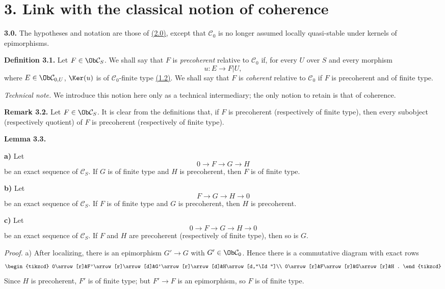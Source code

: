 \section*{3. Link with the classical notion of coherence}

\textbf{3.0.} The hypotheses and notation are those of \hyperlink{sga6.e01.para.2-0}{(2.0)}, except that \(\mathcal C_0\) is no longer assumed locally quasi-stable under kernels of epimorphisms.

\textbf{Definition 3.1.} Let \(F\in\Ob\mathcal C_S\). We shall say that \(F\) is \emph{precoherent} relative to \(\mathcal C_0\) if, for every \(U\) over \(S\) and every morphism
\[
  u:E\longrightarrow F|U,
\]
where \(E\in\Ob\mathcal C_{0,U}\), \(\Ker(u)\) is of \(\mathcal C_0\)-finite type \hyperlink{sga6.e01.sec.1.2}{(1.2)}. We shall say that \(F\) is \emph{coherent} relative to \(\mathcal C_0\) if \(F\) is precoherent and of finite type.

\emph{Technical note.} We introduce this notion here only as a technical intermediary; the only notion to retain is that of coherence.

\textbf{Remark 3.2.} Let \(F\in\Ob\mathcal C_S\). It is clear from the definitions that, if \(F\) is precoherent (respectively of finite type), then every subobject (respectively quotient) of \(F\) is precoherent (respectively of finite type).

\textbf{Lemma 3.3.}

\textbf{a)} Let
\[
  0\longrightarrow F\longrightarrow G\longrightarrow H
\]
be an exact sequence of \(\mathcal C_S\). If \(G\) is of finite type and \(H\) is precoherent, then \(F\) is of finite type.

\textbf{b)} Let
\[
  F\longrightarrow G\longrightarrow H\longrightarrow 0
\]
be an exact sequence of \(\mathcal C_S\). If \(F\) is of finite type and \(G\) is precoherent, then \(H\) is precoherent.

\textbf{c)} Let
\[
  0\longrightarrow F\longrightarrow G\longrightarrow H\longrightarrow 0
\]
be an exact sequence of \(\mathcal C_S\). If \(F\) and \(H\) are precoherent (respectively of finite type), then so is \(G\).

\emph{Proof.} a) After localizing, there is an epimorphism \(G'\to G\) with \(G'\in\Ob\mathcal C_0\). Hence there is a commutative diagram with exact rows
\[
\begin{tikzcd}
0\arrow[r]&F'\arrow[r]\arrow[d]&G'\arrow[r]\arrow[d]&H\arrow[d,"\Id"]\\
0\arrow[r]&F\arrow[r]&G\arrow[r]&H .
\end{tikzcd}
\]
Since \(H\) is precoherent, \(F'\) is of finite type; but \(F'\to F\) is an epimorphism, so \(F\) is of finite type.

